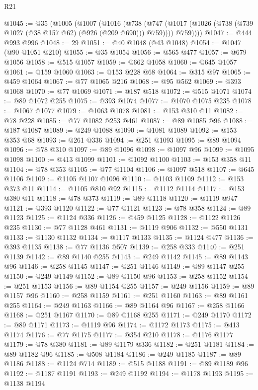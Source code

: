 \begin{lexlean}{R21}
\begin{coremodule}
@1045 := @35
    (@1005
      (@1007
        (@1016
          (@738
            (@747 (@1017 (@1026 (@738 (@739 @1027 (@38 @157 @62) (@926 (@209 @690))) @759))))
            @759))))
@1047 := @444 @993 @996
@1048 := 29
@1051 := @40 @1048 (@43 @1048)
@1054 := @1047 (@90 @1051 @210)
@1055 := @35 @1054
@1056 := @565 @477
@1057 := @679 @1056
@1058 := @515 @1057
@1059 := @662 @1058
@1060 := @645 @1057
@1061 := @159 @1060
@1063 := @153 @228 @68
@1064 := @315 @97
@1065 := @459 @1064
@1067 := @77 @1065 @216
@1068 := @95 @562
@1069 := @393 @1068
@1070 := @77 @1069
@1071 := @187 @518
@1072 := @515 @1071
@1074 := @89 @1072 @255
@1075 := @393 @1074
@1077 := @1070 @1075 @235
@1078 := @1067 @1077
@1079 := @1063 @1078
@1081 := @153 @310 @11
@1082 := @78 @228
@1085 := @77 @1082 @253 @461
@1087 := @89 @1085 @96
@1088 := @187 @1087
@1089 := @249 @1088
@1090 := @1081 @1089
@1092 := @153 @353 @68
@1093 := @261 @336
@1094 := @251 @1093
@1095 := @89 @1094
@1096 := @78 @310
@1097 := @89 @1096
@1098 := @1097 @96
@1099 := @1095 @1098
@1100 := @413 @1099
@1101 := @1092 @1100
@1103 := @153 @358 @11
@1104 := @78 @353
@1105 := @77 @1104
@1106 := @1097 @518
@1107 := @645 @1106
@1109 := @1105 @1107 @1096
@1110 := @1103 @1109
@1112 := @153 @373 @11
@1114 := @1105 @810 @92
@1115 := @1112 @1114
@1117 := @153 @380 @11
@1118 := @78 @373
@1119 := @89 @1118
@1120 := @1119 @947
@1121 := @393 @1120
@1122 := @77 @1121
@1123 := @78 @358
@1124 := @89 @1123
@1125 := @1124 @336
@1126 := @459 @1125
@1128 := @1122 @1126 @235
@1130 := @77 @1128 @461
@1131 := @1119 @906
@1132 := @550 @1131
@1133 := @1130 @1132
@1134 := @1117 @1133
@1135 := @1124 @477
@1136 := @393 @1135
@1138 := @77 @1136 @507
@1139 := @258 @333
@1140 := @251 @1139
@1142 := @89 @1140 @255
@1143 := @249 @1142
@1145 := @89 @1143 @96
@1146 := @258 @1145
@1147 := @251 @1146
@1149 := @89 @1147 @255
@1150 := @249 @1149
@1152 := @89 @1150 @96
@1153 := @258 @1152
@1154 := @251 @1153
@1156 := @89 @1154 @255
@1157 := @249 @1156
@1159 := @89 @1157 @96
@1160 := @258 @1159
@1161 := @251 @1160
@1163 := @89 @1161 @255
@1164 := @249 @1163
@1166 := @89 @1164 @96
@1167 := @258 @1166
@1168 := @251 @1167
@1170 := @89 @1168 @255
@1171 := @249 @1170
@1172 := @89 @1171
@1173 := @1119 @96
@1174 := @1172 @1173
@1175 := @413 @1174
@1176 := @77 @1175
@1177 := @354 @210
@1178 := @1176 @1177
@1179 := @78 @380
@1181 := @89 @1179 @336
@1182 := @251 @1181
@1184 := @89 @1182 @96
@1185 := @508 @1184
@1186 := @249 @1185
@1187 := @89 @1186
@1188 := @1124 @714
@1189 := @515 @1188
@1191 := @89 @1189 @96
@1192 := @1187 @1191
@1193 := @249 @1192
@1194 := @1178 @1193
@1195 := @1138 @1194

\end{coremodule}
\end{lexlean}
